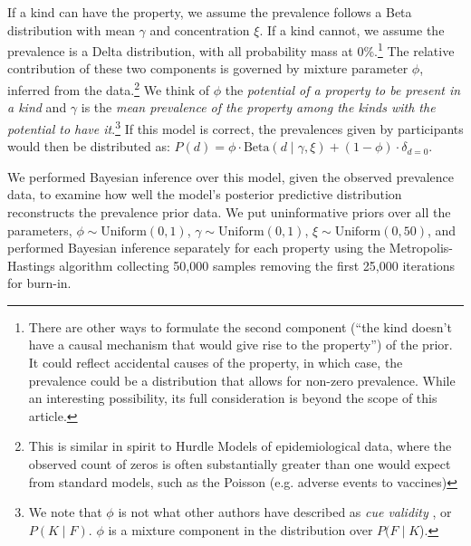 \documentclass[12pt,letterpaper]{article}
\newcommand{\ndg}[1]{\textcolor{Green}{[ndg: #1]}}
\newcommand{\mht}[1]{\textcolor{Blue}{[mht: #1]}}
\begin{document}
If a kind can have the property, we assume the prevalence follows a Beta distribution with mean $\gamma$ and concentration $\xi$. 
If a kind cannot, we assume the prevalence is a Delta distribution, with all probability mass at 0\%.\footnote{There are other ways to formulate the second component (``the kind doesn't have a causal mechanism that would give rise to  the property'') of the prior. 
It could reflect accidental causes of the property, in which case, the prevalence could be a distribution that allows for non-zero prevalence. 
While an interesting possibility, its full consideration is beyond the scope of this article.
}
The relative contribution of these two components is governed by mixture parameter $\phi$, inferred from the data.\footnote{This is similar in spirit to Hurdle Models of epidemiological data, where the observed count of zeros is often substantially greater than one would expect from standard models, such as the Poisson (e.g. adverse events to vaccines)\cite{hurdleModels}}
We think of $\phi$ the \emph{potential of a property to be present in a kind} and $\gamma$ is the \emph{mean prevalence of the property among the kinds with the potential to have it}.\footnote{We note that $\phi$ is not what other authors have described as \emph{cue validity} \cite{Beach1964, Khemlani2012}, or $P(K \mid F)$. 
$\phi$ is a mixture component in the distribution over $P(F\mid K$).
}
If this model is correct, the prevalences given by participants would then be distributed as: $P(d) = \phi \cdot \text{Beta}(d \mid \gamma,\xi)+ (1 - \phi) \cdot \delta_{d=0} $. 



We performed Bayesian inference over this model, given the observed prevalence data, to examine how well the model's posterior predictive distribution reconstructs the prevalence prior data.
We put uninformative priors over all the parameters, $\phi \sim \text{Uniform}(0,1)$, 
$\gamma \sim \text{Uniform}(0,1)$, $\xi \sim \text{Uniform}(0, 50)$, 
and performed Bayesian inference separately for each property using the Metropolis-Hastings algorithm 
collecting 50,000 samples removing the first 25,000 iterations for burn-in.
\end{document}
